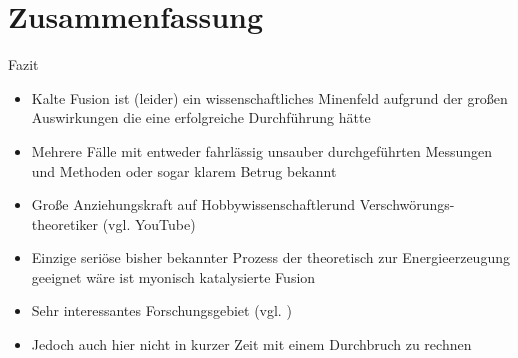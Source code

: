 \section{Zusammenfassung}

\begin{frame}{Fazit}
    \begin{itemize}
        \item<+-> Kalte Fusion ist (leider) ein wissenschaftliches Minenfeld aufgrund der großen Auswirkungen die eine erfolgreiche Durchführung hätte
        \item<+-> Mehrere Fälle mit entweder fahrlässig unsauber durchgeführten Messungen und Methoden oder sogar klarem Betrug bekannt
        \item<+-> Große Anziehungskraft auf \glqq Hobbywissenschaftler\grqq und Verschwörungs- theoretiker (vgl. YouTube)
        \item<+-> Einzige seriöse bisher bekannter Prozess der theoretisch zur Energieerzeugung geeignet wäre ist myonisch katalysierte Fusion
        \item<+-> Sehr interessantes Forschungsgebiet (vgl. \cite{Naga03})
        \item<+-> Jedoch auch hier nicht in kurzer Zeit mit einem Durchbruch zu rechnen
    \end{itemize}
\end{frame}


